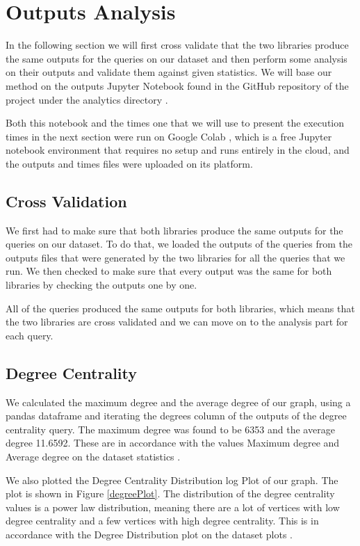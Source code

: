 \documentclass[conference]{IEEEtran}
\begin{document}
\section{\textbf{Outputs Analysis}}\label{outs}

In the following section we will first cross validate that the two libraries produce the same outputs for the queries on our dataset and then perform some analysis on their outputs and validate them against given statistics. We will base our method on the outputs Jupyter Notebook \cite{b13} found in the GitHub repository of the project under the analytics directory \cite{b3} \cite{b4}.

Both this notebook and the times one that we will use to present the execution times in the next section were run on Google Colab \cite{b14}, which is a free Jupyter notebook environment that requires no setup and runs entirely in the cloud, and the outputs and times files were uploaded on its platform.

\subsection{Cross Validation}

We first had to make sure that both libraries produce the same outputs for the queries on our dataset. To do that, we loaded the outputs of the queries from the outputs files that were generated by the two libraries for all the queries that we run. We then checked to make sure that every output was the same for both libraries by checking the outputs one by one.

All of the queries produced the same outputs for both libraries, which means that the two libraries are cross validated and we can move on to the analysis part for each query.

\subsection{Degree Centrality}

We calculated the maximum degree and the average degree of our graph, using a pandas dataframe \cite{b15} and iterating the degrees column of the outputs of the degree centrality query. The maximum degree was found to be 6353 and the average degree 11.6592. These are in accordance with the values Maximum degree and Average degree on the dataset statistics \cite{b6}.

We also plotted the Degree Centrality Distribution log Plot of our graph. The plot is shown in Figure \ref{degreePlot}. The distribution of the degree centrality values is a power law distribution, meaning there are a lot of vertices with low degree centrality and a few vertices with high degree centrality. This is in accordance with the Degree Distribution plot on the dataset plots \cite{b6}.
\end{document}
